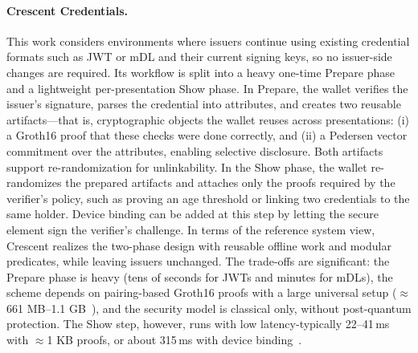 \paragraph{Crescent Credentials.~\cite{cryptoeprint:2024/2013}}
This work considers environments where issuers continue using existing credential formats such as JWT or mDL and their current signing keys, so no issuer-side changes are required.
Its workflow is split into a heavy one-time Prepare phase and a lightweight per-presentation Show phase.
In Prepare, the wallet verifies the issuer’s signature, parses the credential into attributes, and creates two reusable artifacts---that is, cryptographic objects the wallet reuses across presentations: (i) a Groth16 proof that these checks were done correctly, and (ii) a Pedersen vector commitment over the attributes, enabling selective disclosure.
Both artifacts support re-randomization for unlinkability.
In the Show phase, the wallet re-randomizes the prepared artifacts and attaches only the proofs required by the verifier’s policy, such as proving an age threshold or linking two credentials to the same holder. Device binding can be added at this step by letting the secure element sign the verifier’s challenge.
In terms of the reference system view, Crescent realizes the two-phase design with reusable offline work and modular predicates, while leaving issuers unchanged. The trade-offs are significant: the Prepare phase is heavy (tens of seconds for JWTs and minutes for mDLs), the scheme depends on pairing-based Groth16 proofs with a large universal setup ($\approx$ 661 MB–1.1 GB~\cite[\S4]{cryptoeprint:2024/2013}), and the security model is classical only, without post-quantum protection. The Show step, however, runs with low latency-typically 22–41\,ms with $\approx$1 KB proofs, or about 315\,ms with device binding~\cite[\S4]{cryptoeprint:2024/2013}.

